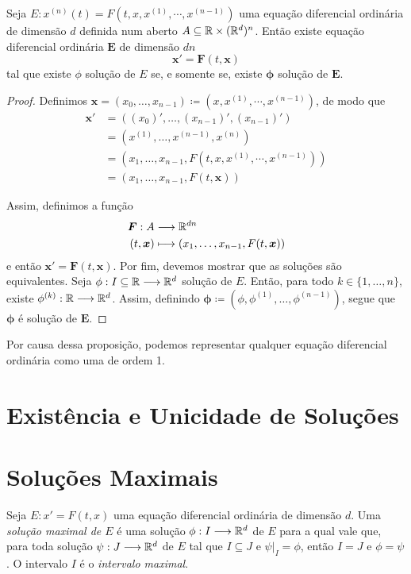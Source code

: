 \begin{prop}
	Seja $E: x^{(n)}(t) = F(t, x, x^{(1)}, \cdots,x^{(n-1)})$ uma equação diferencial ordinária de dimensão $d$ definida num aberto $A \subseteq \mathbb{R} \times (\mathbb{R}^d)^n$. Então existe equação diferencial ordinária $\bm E$ de dimensão $dn$
	\begin{equation*}
	 \bm x' = \bm F(t,\bm x)
	\end{equation*}	
tal que existe $\phi$ solução de $E$ se, e somente se, existe $\bm \phi$ solução de $\bm E$.
\end{prop}
\begin{proof}
	Definimos $\bm x = (x_0, \ldots,x_{n-1}) \coloneqq (x,x^{(1)}, \cdots,x^{(n-1)})$, de modo que
	\begin{align*}
	\bm x' &= ((x_0)',\ldots,(x_{n-1})',(x_{n-1})') \\
			&= (x^{(1)}, \ldots,x^{(n-1)},x^{(n)}) \\
			&= (x_1,\ldots,x_{n-1},F(t, x, x^{(1)}, \cdots,x^{(n-1)})) \\
			&= (x_1,\ldots,x_{n-1},F(t,\bm x))
	\end{align*}	

	Assim, definimos a função
	\begin{align*}
	{\bm F}: {A} &\longrightarrow {\mathbb{R}^{dn}} \\{(t,\bm x)} &\longmapsto {(x_1,\ldots,x_{n-1},F(t, \bm x))}
	\end{align*}
e então $\bm x' = \bm F(t,\bm x)$. Por fim, devemos mostrar que as soluções são equivalentes. Seja $\phi: I \subseteq \mathbb{R} \longrightarrow \mathbb{R}^d$ solução de $E$. Então, para todo $k \in \{1,\ldots,n\}$, existe $\phi^{(k)}: \mathbb{R} \longrightarrow \mathbb{R}^d$. Assim, definindo $\bm \phi \coloneqq (\phi,\phi^{(1)},\ldots,\phi^{(n-1)})$, segue que $\bm \phi$ é solução de $\bm E$.
\end{proof}

Por causa dessa proposição, podemos representar qualquer equação diferencial ordinária como uma de ordem 1.

\section{Existência e Unicidade de Soluções}



\section{Soluções Maximais}

\begin{defi}
	Seja $E: x'=F(t,x)$ uma equação diferencial ordinária de dimensão $d$. Uma \emph{solução maximal de $E$} é uma solução $\phi: I \longrightarrow \mathbb{R}^d$ de $E$ para a qual vale que, para toda solução $\psi: J \longrightarrow \mathbb{R}^d$ de $E$ tal que $I \subseteq J$ e $\psi|_I = \phi$, então $I = J$ e $\phi = \psi$. O intervalo $I$ é o \emph{intervalo maximal}.
\end{defi}

